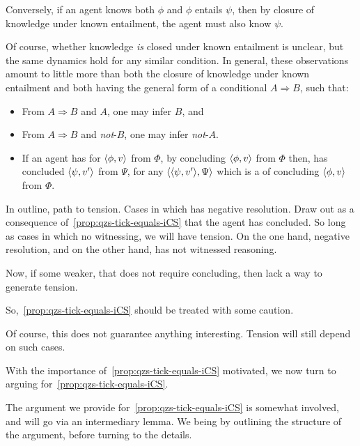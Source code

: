 \begin{note}[Contraposition]
{    Conversely, if an agent knows both \(\phi\) and \(\phi\) entails \(\psi\), then by closure of knowledge under known entailment, the agent must also know \(\psi\).

    Of course, whether knowledge \emph{is} closed under known entailment is unclear, but the same dynamics hold for any similar condition.
    In general, these observations amount to little more than both the closure of knowledge under known entailment and \izetaS{} both having the general form of a conditional \(A \Rightarrow B\), such that:
    \begin{itemize}
    \item
      From \(A \Rightarrow B\) and \(A\), one may infer \(B\), and
    \item
      From \(A \Rightarrow B\) and \emph{not}-\(B\), one may infer \emph{not}-\(A\).
    \end{itemize}
  }

  \begin{itemize}
  \item
    If an agent has \zetaS{} for \(\langle \phi, v \rangle\) from \(\Phi\), by concluding \(\langle \phi, v \rangle\) from \(\Phi\) then, has concluded \(\langle \psi, v' \rangle\) from \(\Psi\), for any \(\langle \langle \psi, v' \rangle, \Psi \rangle\) which is a \requ{} of concluding \(\langle \phi, v \rangle\) from \(\Phi\).
  \end{itemize}

  In outline, path to tension.
  Cases in which \qzS{} has negative resolution.
  Draw out as a consequence of~\autoref{prop:qzs-tick-equals-iCS} that the agent has concluded.
  So long as cases in which no witnessing, we will have tension.
  On the one hand, negative resolution, and on the other hand, has not witnessed reasoning.

  Now, if some weaker, that does not require concluding, then lack a way to generate tension.

  So,~\autoref{prop:qzs-tick-equals-iCS} should be treated with some caution.

  Of course, this does not guarantee anything interesting.
  Tension will still depend on such cases.
\end{note}

\begin{note}
  With the importance of~\autoref{prop:qzs-tick-equals-iCS} motivated, we now turn to arguing for~\autoref{prop:qzs-tick-equals-iCS}.

  The argument we provide for~\autoref{prop:qzs-tick-equals-iCS} is somewhat involved, and will go via an intermediary lemma.
  We being by outlining the structure of the argument, before turning to the details.
\end{note}

